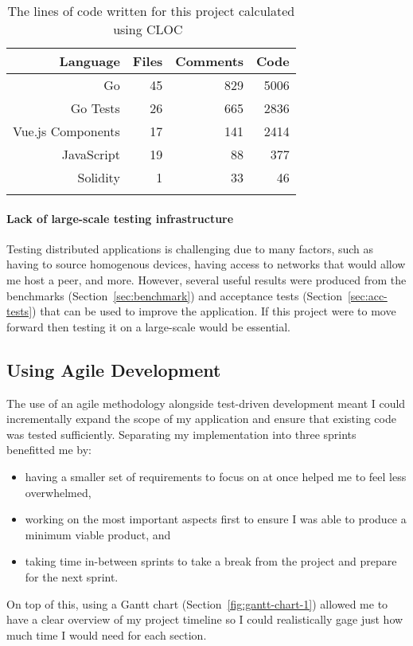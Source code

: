 \begin{longtable}{ | r | r | r | r | }
  \hline
  \textbf{Language} & \textbf{Files} & \textbf{Comments} & \textbf{Code}
  \\\hline
  Go
  & 45
  & 829
  & 5006
  \\\hline
  Go Tests
  & 26
  & 665
  & 2836
  \\\hline
  Vue.js Components
  & 17
  & 141
  & 2414
  \\\hline
  JavaScript
  & 19
  & 88
  & 377
  \\\hline
  Solidity
  & 1
  & 33
  & 46
  \\\hline
  \caption{The lines of code written for this project calculated using CLOC~\cite{noauthor_aldanialcloc_nodate}}
  \label{tab:cloc}
\end{longtable}

\paragraph*{Lack of large-scale testing infrastructure}
Testing distributed applications is challenging due to many factors, such as having to source homogenous devices, having access to networks that would allow me host a peer, and more. However, several useful results were produced from the benchmarks (Section~\ref{sec:benchmark}) and acceptance tests (Section~\ref{sec:acc-tests}) that can be used to improve the application. If this project were to move forward then testing it on a large-scale would be essential.

\subsection*{Using Agile Development}

The use of an agile methodology alongside test-driven development meant I could incrementally expand the scope of my application and ensure that existing code was tested sufficiently. Separating my implementation into three sprints benefitted me by:

\begin{itemize}
  \item having a smaller set of requirements to focus on at once helped me to feel less overwhelmed,
  \item working on the most important aspects first to ensure I was able to produce a minimum viable product, and
  \item taking time in-between sprints to take a break from the project and prepare for the next sprint.
\end{itemize}

\vspace{2mm}\noindent
On top of this, using a Gantt chart (Section~\ref{fig:gantt-chart-1}) allowed me to have a clear overview of my project timeline so I could realistically gage just how much time I would need for each section.